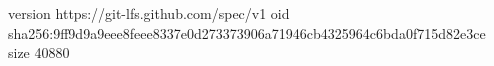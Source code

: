 version https://git-lfs.github.com/spec/v1
oid sha256:9ff9d9a9eee8feee8337e0d273373906a71946cb4325964c6bda0f715d82e3ce
size 40880
